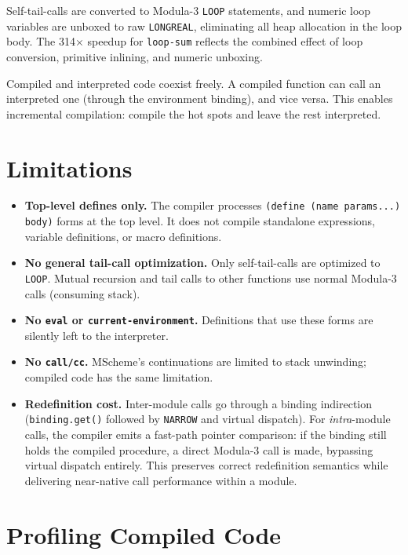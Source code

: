 \documentclass[12pt]{report}
\begin{document}
Self-tail-calls are converted to Modula-3 \texttt{LOOP} statements,
and numeric loop variables are unboxed to raw \texttt{LONGREAL},
eliminating all heap allocation in the loop body.  The 314$\times$
speedup for \texttt{loop-sum} reflects the combined effect of loop
conversion, primitive inlining, and numeric unboxing.

Compiled and interpreted code coexist freely.  A compiled function
can call an interpreted one (through the environment binding), and
vice versa.  This enables incremental compilation: compile the
hot spots and leave the rest interpreted.

\section{Limitations}

\begin{itemize}
\item \textbf{Top-level defines only.}  The compiler processes
  \texttt{(define (name params...) body)} forms at the top level.
  It does not compile standalone expressions, variable definitions,
  or macro definitions.

\item \textbf{No general tail-call optimization.}  Only self-tail-calls
  are optimized to \texttt{LOOP}.  Mutual recursion and tail calls to
  other functions use normal Modula-3 calls (consuming stack).

\item \textbf{No \texttt{eval} or \texttt{current-environment}.}
  Definitions that use these forms are silently left to the
  interpreter.

\item \textbf{No \texttt{call/cc}.}  MScheme's continuations are
  limited to stack unwinding; compiled code has the same limitation.

\item \textbf{Redefinition cost.}  Inter-module calls go through a
  binding indirection (\texttt{binding.get()} followed by
  \texttt{NARROW} and virtual dispatch).  For \emph{intra}-module
  calls, the compiler emits a fast-path pointer comparison: if the
  binding still holds the compiled procedure, a direct Modula-3
  call is made, bypassing virtual dispatch entirely.  This
  preserves correct redefinition semantics while delivering
  near-native call performance within a module.
\end{itemize}

\section{Profiling Compiled Code}
\end{document}
